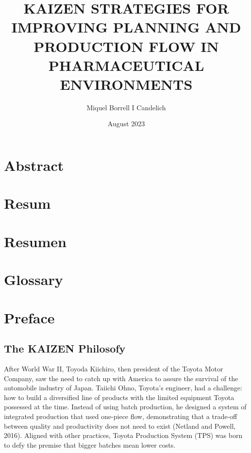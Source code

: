\documentclass[]{article}
\title{KAIZEN STRATEGIES FOR IMPROVING PLANNING AND PRODUCTION FLOW IN PHARMACEUTICAL ENVIRONMENTS}
\author{Miquel Borrell I Candelich}
\date{August 2023}
\begin{document}
\onehalfspacing
\pagestyle{fancy}
\fancyfoot[C]{\thepage}
\fancyhead[L]{}






\newpage
\newpage

\justifying
\section{Abstract}\label{abstract}
\newpage

\section{Resum}\label{resum}
\newpage

\section{Resumen}\label{resumen}
\newpage

\section{Glossary}
\newpage

\tableofcontents

\section{Preface}\label{preface}
\subsection{The KAIZEN Philosofy}\label{philosofy}
After World War II, Toyoda Kiichiro, then president of the Toyota Motor Company, saw the need
to catch up with America to assure the survival of the automobile industry of Japan. Taiichi Ohno,
Toyota’s engineer, had a challenge: how to build a diversified line of products with the limited
equipment Toyota possessed at the time. Instead of using batch production, he designed a system
of integrated production that used one-piece flow, demonstrating that a trade-off between quality
and productivity does not need to exist (Netland and Powell, 2016). Aligned with other practices,
Toyota Production System (TPS) was born to defy the premise that bigger batches mean lower
costs.
\end{document}
